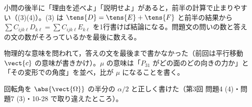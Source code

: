 \item 小問の後半に「理由を述べよ」「説明せよ」があると，前半の計算で止まりやすい（(3)(4)）。(3) は $\tens{D}=\tens{E}+\tens{F}$ と前半の結果から $\sum C_{ijk\ell}D_{k\ell}=\sum C_{ijk\ell}E_{k\ell}$ を1行書けば結論になる。問題文の問いの数と答えの文の数がそろっているかを最後に数える。
\item {} 物理的な意味を問われて，答えの文を最後まで書かなかった（前回は平行移動 $\vect{c}$ の意味が書きかけ）。$\mu$ の意味は「$P_{31}$ がどの面のどの向きの力か」と「その変形での角度」を並べ，比が $\mu$ になることを書く。
\item 回転角を $\abs{\vect{\Omega}}$ の半分の $\alpha/2$ と正しく書けた（第3回 問題4 (4)・問題7 (3)・10-28 で取り違えたところ）。
